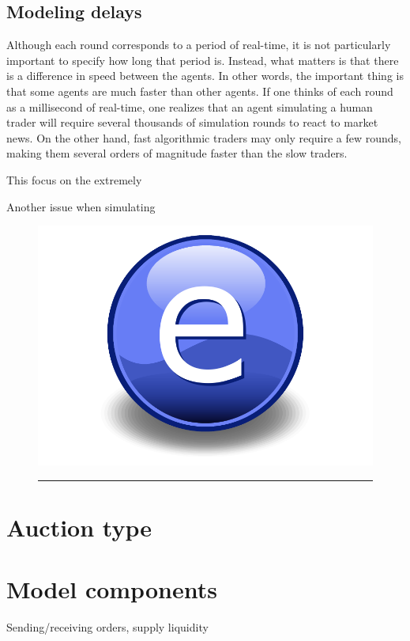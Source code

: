 \subsection{Modeling delays}

Although each round corresponds to a period of real-time, it is not particularly important to specify how long that period is. Instead, what matters is that there is a difference in speed between the agents. In other words, the important thing is that some agents are much faster than other agents. If one thinks of each round as a millisecond of real-time, one realizes that an agent simulating a human trader will require several thousands of simulation rounds to react to market news. On the other hand, fast algorithmic traders may only require a few rounds, making them several orders of magnitude faster than the slow traders. 

This focus on the extremely 

Another issue when simulating 



\begin{figure}[htbp]
	\centering
		\includegraphics{Figures/Electron.pdf}
		\rule{35em}{0.5pt}
	\caption{}
	\label{fig:agents_and_market}
\end{figure}



\section{Auction type}

\section{Model components}
Sending/receiving orders, supply liquidity

